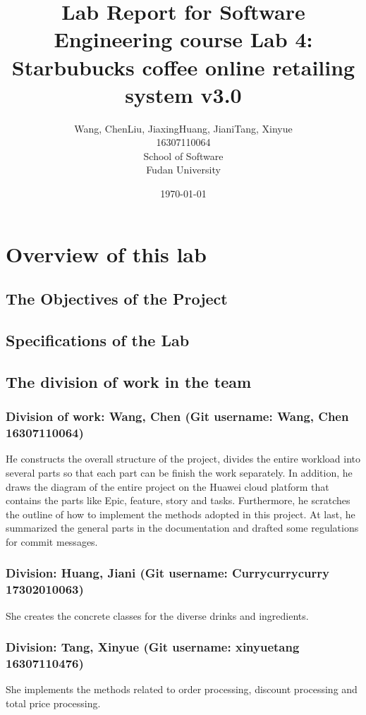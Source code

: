 \documentclass[a4paper]{report}
\title{Lab Report for Software Engineering course \newline
 Lab 4: Starbubucks coffee online retailing system v3.0}
\author{Wang, Chen\qquad Liu, Jiaxing\qquad Huang, Jiani\qquad Tang, Xinyue \\
16307110064\qquad17302010049\qquad 17302010063\qquad 16307110476 \\
School of Software\\
Fudan University
}
\date{\today}
\begin{document}
\maketitle

\tableofcontents
\chapter{Overview of this lab}
\section{The Objectives of the Project}
\section{Specifications of the Lab}
\section{The division of work in the team}

\subsection{Division of work: Wang, Chen (Git username: Wang, Chen 16307110064)}
He constructs the overall structure of the project, divides the entire workload into several parts so that each part can be finish the work separately. In addition, he draws the diagram of the entire project on the Huawei cloud platform that contains the parts like Epic, feature, story and tasks. Furthermore, he scratches the outline of how to implement the methods adopted in this project. At last, he summarized the general parts in the documentation and drafted some regulations for commit messages.

\subsection{Division: Huang, Jiani (Git username: Currycurrycurry 17302010063)}
She creates the concrete classes for the diverse drinks and ingredients.

\subsection{Division: Tang, Xinyue (Git username: xinyuetang 16307110476)}
She implements the methods related to order processing, discount processing and total price processing.
\end{document}

